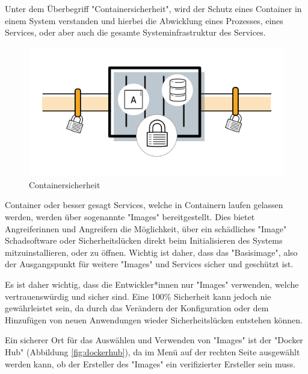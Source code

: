 
Unter dem Überbegriff "Containersicherheit", wird der Schutz eines Container in einem System verstanden und hierbei die Abwicklung eines Prozesses, eines Services, oder aber auch die gesamte Systeminfrastruktur des Services. \cite{ContainerSecurity}

\begin{figure}[H]
    \centering
    \includegraphics[width=\textwidth]{media/DockerAndContainering/Containersicherheit.png}
    \caption{Containersicherheit \cite{ContainerSecurity}}
\end{figure}


Container oder besser gesagt Services, welche in Containern laufen gelassen werden, werden über sogenannte "Images" bereitgestellt. Dies bietet Angreiferinnen und Angreifern die Möglichkeit, über ein schädliches "Image" Schadsoftware oder Sicherheitslücken direkt beim Initialisieren des Systems mitzuinstallieren, oder zu öffnen. Wichtig ist daher, dass das "Basisimage", also der Ausgangspunkt für weitere "Images" und Services sicher und geschützt ist. \cite{ContainerSecurity}

Es ist daher wichtig, dass die Entwickler*innen nur "Images" verwenden, welche vertrauenswürdig und sicher sind. Eine 100\% Sicherheit kann jedoch nie gewährleistet sein, da durch das Verändern der Konfiguration oder dem Hinzufügen von neuen Anwendungen wieder Sicherheitslücken entstehen können. \cite{ContainerSecurity}

Ein sicherer Ort für das Auswählen und Verwenden von "Images" ist der "Docker Hub" (Abbildung \ref{fig:dockerhub}), da im Menü auf der rechten Seite ausgewählt werden kann, ob der Ersteller des "Images" ein verifizierter Ersteller sein muss. \cite{ContainerSecurity}

